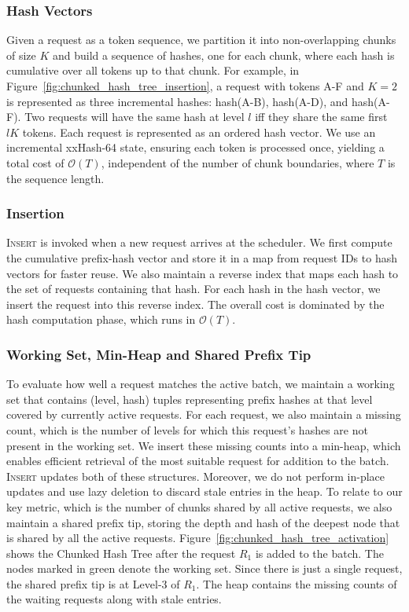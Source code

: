 \subsubsection*{Hash Vectors}
Given a request as a token sequence, we partition it into non-overlapping chunks of size $K$ and build a sequence of hashes, one for each chunk, where each hash is cumulative over all tokens up to that chunk. For example, in Figure~\ref{fig:chunked_hash_tree_insertion}, a request with tokens A-F and $K = 2$ is represented as three incremental hashes: hash(A-B), hash(A-D), and hash(A-F). Two requests will have the same hash at level $l$ iff they share the same first $lK$ tokens. Each request is represented as an ordered hash vector. We use an incremental xxHash-64 state, ensuring each token is processed once, yielding a total cost of $\mathcal{O}(T)$, independent of the number of chunk boundaries, where $T$ is the sequence length.



\vspace{-5pt}

\subsubsection*{Insertion}
\textsc{Insert} is invoked when a new request arrives at the scheduler. We first compute the cumulative prefix-hash vector and store it in a map from request IDs to hash vectors for faster reuse. We also maintain a reverse index that maps each hash to the set of requests containing that hash. For each hash in the hash vector, we insert the request into this reverse index. The overall cost is dominated by the hash computation phase, which runs in $\mathcal{O}(T)$.

\vspace{-5pt}

\subsubsection*{Working Set, Min-Heap and Shared Prefix Tip}
To evaluate how well a request matches the active batch, we maintain a working set that contains (level, hash) tuples representing prefix hashes at that level covered by currently active requests. For each request, we also maintain a missing count, which is the number of levels for which this request's hashes are not present in the working set. We insert these missing counts into a min-heap, which enables efficient retrieval of the most suitable request for addition to the batch. \textsc{Insert} updates both of these structures. Moreover, we do not perform in-place updates and use lazy deletion to discard stale entries in the heap. To relate to our key metric, which is the number of chunks shared by all active requests, we also maintain a shared prefix tip, storing the depth and hash of the deepest node that is shared by all the active requests. Figure~\ref{fig:chunked_hash_tree_activation} shows the Chunked Hash Tree after the request $R_1$ is added to the batch. The nodes marked in green denote the working set. Since there is just a single request, the shared prefix tip is at Level-3 of $R_1$. The heap contains the missing counts of the waiting requests along with stale entries. 

